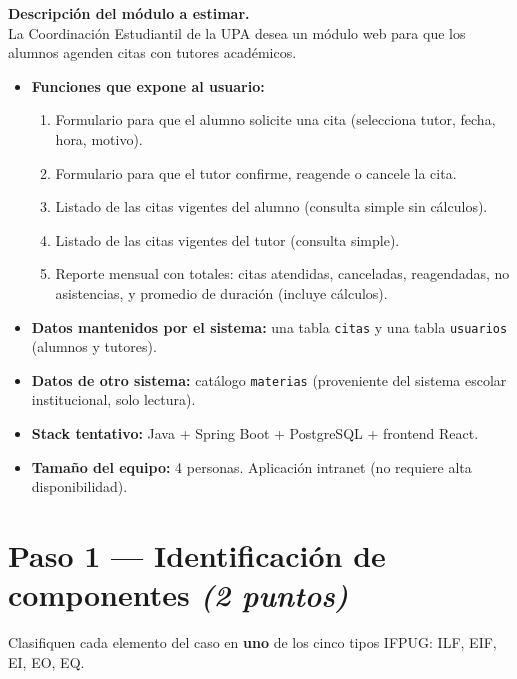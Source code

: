 \documentclass[11pt,a4paper]{article}
\begin{document}
\colorbox{accentbg}{\parbox{\dimexpr\linewidth-2\fboxsep}{%
\textbf{Descripción del módulo a estimar.}\\[0.3em]
La Coordinación Estudiantil de la UPA desea un módulo web para que los alumnos agenden citas con tutores académicos.
\begin{itemize}[leftmargin=1.3em,itemsep=0.05em,topsep=0.2em]
  \item \textbf{Funciones que expone al usuario:}
  \begin{enumerate}[leftmargin=1.2em,itemsep=0em,topsep=0.05em,label=(\arabic*)]
    \item Formulario para que el alumno solicite una cita (selecciona tutor, fecha, hora, motivo).
    \item Formulario para que el tutor confirme, reagende o cancele la cita.
    \item Listado de las citas vigentes del alumno (consulta simple sin cálculos).
    \item Listado de las citas vigentes del tutor (consulta simple).
    \item Reporte mensual con totales: citas atendidas, canceladas, reagendadas, no asistencias, y promedio de duración (incluye cálculos).
  \end{enumerate}
  \item \textbf{Datos mantenidos por el sistema:} una tabla \texttt{citas} y una tabla \texttt{usuarios} (alumnos y tutores).
  \item \textbf{Datos de otro sistema:} catálogo \texttt{materias} (proveniente del sistema escolar institucional, solo lectura).
  \item \textbf{Stack tentativo:} Java + Spring Boot + PostgreSQL + frontend React.
  \item \textbf{Tamaño del equipo:} 4 personas. Aplicación intranet (no requiere alta disponibilidad).
\end{itemize}
}}

\clearpage

\section*{Paso 1 --- Identificación de componentes \hfill {\normalsize\color{lighttext}\itshape (2 puntos)}}

\noindent
Clasifiquen cada elemento del caso en \textbf{uno} de los cinco tipos IFPUG: ILF, EIF, EI, EO, EQ.
\end{document}
